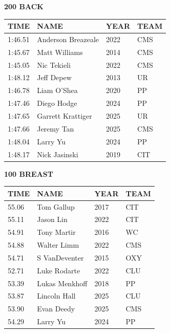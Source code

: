 \begin{table}[H]
\centering
\begin{minipage}[t]{0.48\textwidth}
\centering
\textbf{200 BACK}\\[0.1cm]
\begin{tabular}{@{}p{1.8cm}p{2.8cm}p{1.2cm}p{1.4cm}@{}}
\hline
    \textbf{TIME} & \textbf{NAME} & \textbf{YEAR} & \textbf{TEAM} \\
\hline
    1:46.51 & Anderson Breazeale & 2022 & CMS \\
    1:45.67 & Matt Williams & 2014 & CMS \\
    1:45.05 & Nic Tekieli & 2022 & CMS \\
    1:48.12 & Jeff Depew & 2013 & UR \\
    1:46.78 & Liam O'Shea & 2020 & PP \\
    1:47.46 & Diego Hodge & 2024 & PP \\
    1:47.65 & Garrett Krattiger & 2025 & UR \\
    1:47.66 & Jeremy Tan & 2025 & CMS \\
    1:48.04 & Larry Yu & 2024 & PP \\
    1:48.17 & Nick Jasinski & 2019 & CIT \\
\hline
\end{tabular}
\end{minipage}\hfill
\begin{minipage}[t]{0.48\textwidth}
\centering
\textbf{100 BREAST}\\[0.1cm]
\begin{tabular}{@{}p{1.8cm}p{2.8cm}p{1.2cm}p{1.4cm}@{}}
\hline
    \textbf{TIME} & \textbf{NAME} & \textbf{YEAR} & \textbf{TEAM} \\
\hline
    55.06 & Tom Gallup & 2017 & CIT \\
    55.11 & Jason Lin & 2022 & CIT \\
    54.91 & Tony Martir & 2016 & WC \\
    54.88 & Walter Limm & 2022 & CMS \\
    54.71 & S VanDeventer & 2015 & OXY \\
    52.71 & Luke Rodarte & 2022 & CLU \\
    53.39 & Lukas Menkhoff & 2018 & PP \\
    53.87 & Lincoln Hall & 2025 & CLU \\
    53.90 & Evan Deedy & 2025 & CMS \\
    54.29 & Larry Yu & 2024 & PP \\
\hline
\end{tabular}
\end{minipage}
\end{table}

